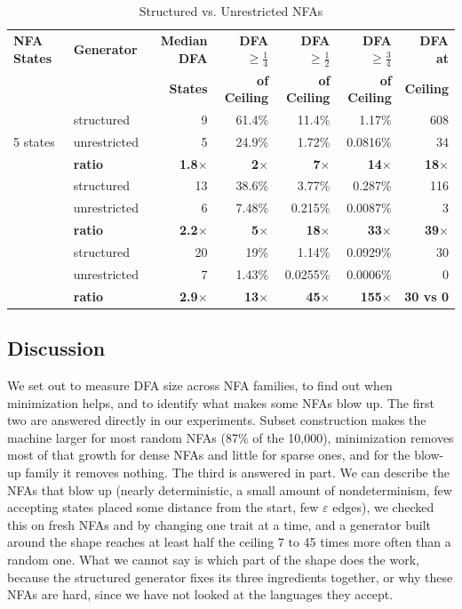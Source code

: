 \documentclass[9pt]{ieeeconf}
\begin{document}
\begin{table}[t]
\centering
\caption{Structured vs. Unrestricted NFAs}
\label{tab:structured_vs_unrestricted_nfas}
\begin{tabular}{@{}llrrrrr@{}}
\toprule
\textbf{NFA States} & \textbf{Generator} & \textbf{Median DFA} & \textbf{DFA $\ge \frac{1}{4}$} & \textbf{DFA $\ge \frac{1}{2}$} & \textbf{DFA $\ge \frac{3}{4}$} & \textbf{DFA at} \\
 & &  \textbf{States} & \textbf{of Ceiling} & \textbf{of Ceiling} & \textbf{of Ceiling} & \textbf{Ceiling} \\
\midrule
\multirow{3}{*}{5 states}
 & structured & 9 & 61.4\% & 11.4\% & 1.17\% & 608 \\
 & unrestricted & 5 & 24.9\% & 1.72\% & 0.0816\% & 34 \\
 & \textbf{ratio} & \textbf{1.8$\times$} & \textbf{2$\times$} & \textbf{7$\times$} & \textbf{14$\times$} & \textbf{18$\times$} \\
\addlinespace
\multirow{3}{*}{6 states}
 & structured & 13 & 38.6\% & 3.77\% & 0.287\% & 116 \\
 & unrestricted & 6 & 7.48\% & 0.215\% & 0.0087\% & 3 \\
 & \textbf{ratio} & \textbf{2.2$\times$} & \textbf{5$\times$} & \textbf{18$\times$} & \textbf{33$\times$} & \textbf{39$\times$} \\
\addlinespace
\multirow{3}{*}{7 states}
 & structured & 20 & 19\% & 1.14\% & 0.0929\% & 30 \\
 & unrestricted & 7 & 1.43\% & 0.0255\% & 0.0006\% & 0 \\
 & \textbf{ratio} & \textbf{2.9$\times$} & \textbf{13$\times$} & \textbf{45$\times$} & \textbf{155$\times$} & \textbf{30 vs 0} \\
\bottomrule
\end{tabular}
\end{table}

\subsection{Discussion}
\label{sec:discussion}

We set out to measure DFA size across NFA families, to find out when minimization helps, and to identify what makes some NFAs blow up. The first two are answered directly in our experiments. Subset construction makes the machine larger for most random NFAs (87\% of the 10,000), minimization removes most of that growth for dense NFAs and little for sparse ones, and for the blow-up family it removes nothing. The third is answered in part. We can describe the NFAs that blow up (nearly deterministic, a small amount of nondeterminism, few accepting states placed some distance from the start, few $\varepsilon$ edges), we checked this on fresh NFAs and by changing one trait at a time, and a generator built around the shape reaches at least half the ceiling 7 to 45 times more often than a random one. What we cannot say is which part of the shape does the work, because the structured generator fixes its three ingredients together, or why these NFAs are hard, since we have not looked at the languages they accept.
\end{document}
